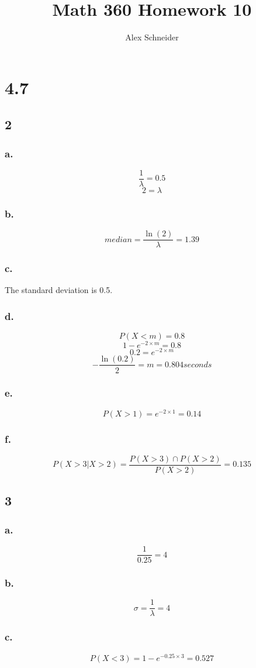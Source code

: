 \documentclass[11pt]{article}
\title{Math 360 Homework 10}
\author{Alex Schneider}
\begin{document}
\maketitle
\section{4.7}
\subsection{2}
\subsubsection{a.}
\[ \frac{1}{\lambda} = 0.5 \]
\[ 2 = \lambda \]
\subsubsection{b.}
\[ median = \frac{\ln(2)}{\lambda} = 1.39 \]
\subsubsection{c.}
The standard deviation is 0.5.
\subsubsection{d.}
\[ P(X < m) = 0.8 \]
\[ 1 - e^{-2\times m} = 0.8 \]
\[ 0.2 = e^{-2\times m} \]
\[ -\frac{\ln(0.2)}{2} = m = 0.804 seconds \]
\subsubsection{e.}
\[ P(X > 1) = e^{-2\times 1} = 0.14 \] 
\subsubsection{f.}
\[ P(X > 3 | X > 2) = \frac{P(X > 3) \cap P(X > 2)}{P(X > 2)} = 0.135 \]
\subsection{3}
\subsubsection{a.}
\[ \frac{1}{0.25} = 4 \]
\subsubsection{b.}
\[ \sigma = \frac{1}{\lambda} = 4 \]
\subsubsection{c.}
\[ P(X < 3) = 1 - e^{-0.25\times 3} = 0.527 \]
\end{document}
